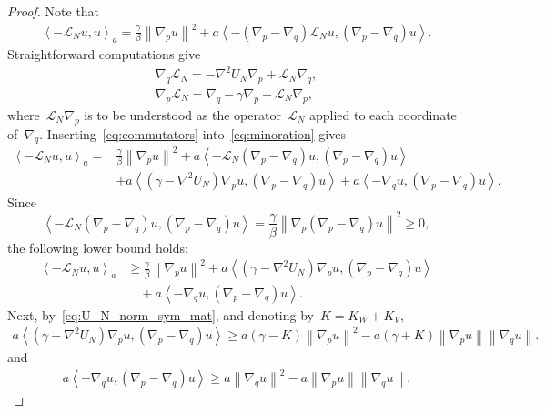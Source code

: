 \documentclass[onefignum,onetabnum]{siamart251216} %
\newcommand{\norm}[1]{\left\lVert#1\right\rVert}
\newcommand{\mc}[1]{\mathcal{#1}}
\renewcommand{\geq}{\geqslant}
\newcommand{\slangle}[1]{\left\langle #1 \right\rangle}
\theoremstyle{plain}
\numberwithin{equation}{section}
\numberwithin{theorem}{section}
\begin{document}
\begin{proof}
  Note that
\begin{align}
    \label{eq:minoration}
\slangle{-\mc{L}_N u ,u}_a = \frac{\gamma}{\beta}\norm{\nabla_p u}^2
+ a\slangle{-(\nabla_p - \nabla_q)\mc{L}_N u ,(\nabla_p - \nabla_q)u}\!.
\end{align}
Straightforward computations give
\begin{align}
    \label{eq:commutators}
    \nabla_q \mc{L}_N = -\nabla^2U_N\nabla_p + \mc{L}_N\nabla_q, \\
    \nabla_p \mc{L}_N = \nabla_q - \gamma\nabla_p + \mc{L}_N\nabla_p,
\end{align}
where~$\mc{L}_N\nabla_p$ is to be understood as the operator~$\mc{L}_N$ applied to each coordinate of~$\nabla_q$.
Inserting~\eqref{eq:commutators} into~\eqref{eq:minoration} gives
\begin{align*}
    \slangle{-\mc{L}_N u ,u}_a = &\frac{\gamma}{\beta}\norm{\nabla_p u}^2 + a\slangle{-\mc{L}_N(\nabla_p - \nabla_q) u ,(\nabla_p - \nabla_q)u} \\
    &+ a \slangle{(\gamma -\nabla^2U_N) \nabla_pu,(\nabla_p - \nabla_q)u} + a\slangle{-\nabla_qu,(\nabla_p - \nabla_q)u}\!.
\end{align*}
Since
\[
\slangle{-\mc{L}_N(\nabla_p - \nabla_q) u ,(\nabla_p - \nabla_q)u} = \frac{\gamma}{\beta}\norm{\nabla_p(\nabla_p - \nabla_q)u}^2 \geq 0,
\]
the following lower bound holds:
\begin{align*}
    \slangle{-\mc{L}_N u ,u}_a &\geq \frac{\gamma}{\beta}\norm{\nabla_p u}^2
    + a \slangle{(\gamma -\nabla^2U_N) \nabla_p u,(\nabla_p - \nabla_q)u} \\
    &\quad + a\slangle{-\nabla_q u,(\nabla_p - \nabla_q)u}.
\end{align*}
Next, by~\eqref{eq:U_N_norm_sym_mat}, and denoting by~$K = K_W + K_V$,
\begin{align}
    \label{eq:hypo_vil1}
a\slangle{(\gamma -\nabla^2U_N) \nabla_p u,(\nabla_p - \nabla_q) u} \geq a(\gamma - K)\norm{\nabla_p u}^2 - a(\gamma + K)\norm{\nabla_p u}\norm{\nabla_q u}.
\end{align}
and
\begin{align}
    \label{eq:hypo_vil2}
a\slangle{-\nabla_q u,(\nabla_p - \nabla_q) u} \geq a \norm{\nabla_q  u}^2 - a \norm{\nabla_p u}\norm{\nabla_q u}.
\end{align}

\end{proof}
\end{document}
